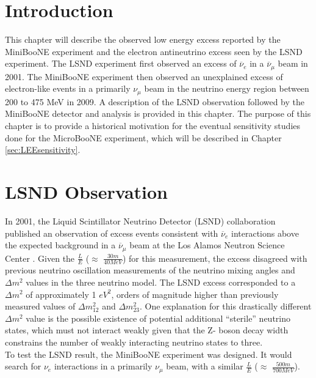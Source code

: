 
\section{Introduction}
This chapter will describe the observed low energy excess reported by the MiniBooNE experiment and the electron antineutrino excess seen by the LSND experiment. The LSND experiment first observed an excess of $\overline{\nu}_e$ in a $\overline{\nu}_\mu$ beam in 2001. The MiniBooNE experiment then observed an unexplained excess of electron-like events in a primarily $\nu_\mu$ beam in the neutrino energy region between 200 to 475 MeV in 2009. A description of the LSND observation followed by the MiniBooNE detector and analysis is provided in this chapter. The purpose of this chapter is to provide a historical motivation for the eventual sensitivity studies done for the MicroBooNE experiment, which will be described in Chapter \ref{sec:LEEsensitivity}.\\

\section{LSND Observation}

In 2001, the Liquid Scintillator Neutrino Detector (LSND) collaboration published an observation of excess events consistent with $\overline{\nu}_e$ interactions above the expected background in a $\overline{\nu}_\mu$ beam at the Los Alamos Neutron Science Center \cite{LSNDPaper}. Given the $\frac{L}{E}$ ($\approx$ $\frac{30 m}{40 MeV}$) for this measurement, the excess disagreed with previous neutrino oscillation measurements of the neutrino mixing angles and $\Delta m^2$ values in the three neutrino model. The LSND excess corresponded to a $\Delta m^2$ of approximately 1 $eV^2$, orders of magnitude higher than previously measured values of $\Delta m_{12}^2$ and $\Delta m_{23}^2$. One explanation for this drastically different $\Delta m^2$ value is the possible existence of potential additional ``sterile'' neutrino states, which must not interact weakly given that the Z- boson decay width constrains the number of weakly interacting neutrino states to three.\\

To test the LSND result, the MiniBooNE experiment was designed. It would search for $\nu_e$ interactions in a primarily $\nu_\mu$ beam, with a similar $\frac{L}{E}$ ($\approx$ $\frac{500m}{700 MeV}$).


